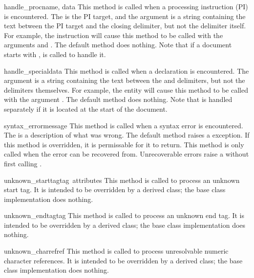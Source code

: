 \begin{funcdesc}{handle_proc}{name, data}
This method is called when a processing instruction (PI) is
encountered.  The  is the PI target, and the 
argument is a string containing the text between the PI target and the
closing delimiter, but not the delimiter itself.  For example, the
instruction  will cause this method to be called
with the arguments  and .  The default method
does nothing.  Note that if a document starts with ,  is called to handle it.
\end{funcdesc}

\begin{funcdesc}{handle_special}{data}
This method is called when a declaration is encountered.  The
 argument is a string containing the text between the
\samp{<!} and \samp{>} delimiters, but not the delimiters
themselves.  For example, the entity  will
cause this method to be called with the argument .  The
default method does nothing.  Note that  is
handled separately if it is located at the start of the document.
\end{funcdesc}

\begin{funcdesc}{syntax_error}{message}
This method is called when a syntax error is encountered.  The
 is a description of what was wrong.  The default method 
raises a  exception.  If this method is
overridden, it is permissable for it to return.  This method is only
called when the error can be recovered from.  Unrecoverable errors
raise a  without first calling
.
\end{funcdesc}

\begin{funcdesc}{unknown_starttag}{tag\, attributes}
This method is called to process an unknown start tag.  It is intended
to be overridden by a derived class; the base class implementation
does nothing.
\end{funcdesc}

\begin{funcdesc}{unknown_endtag}{tag}
This method is called to process an unknown end tag.  It is intended
to be overridden by a derived class; the base class implementation
does nothing.
\end{funcdesc}

\begin{funcdesc}{unknown_charref}{ref}
This method is called to process unresolvable numeric character
references.  It is intended to be overridden by a derived class; the
base class implementation does nothing.
\end{funcdesc}

